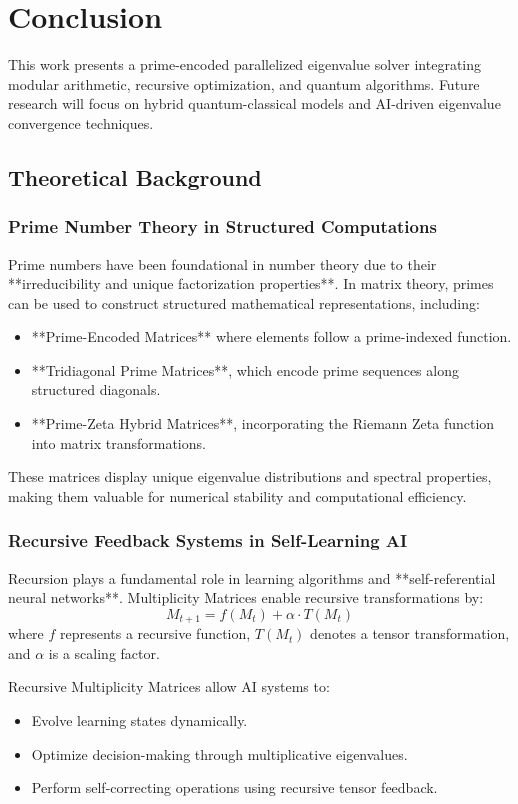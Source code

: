 \documentclass{article}
\theoremstyle{plain}
\begin{document}
\section{Conclusion}
This work presents a prime-encoded parallelized eigenvalue solver integrating modular arithmetic, recursive optimization, and quantum algorithms. Future research will focus on hybrid quantum-classical models and AI-driven eigenvalue convergence techniques.
\subsection{Theoretical Background}

\subsubsection{Prime Number Theory in Structured Computations}
Prime numbers have been foundational in number theory due to their **irreducibility and unique factorization properties**. In matrix theory, primes can be used to construct structured mathematical representations, including:
\begin{itemize}
    \item **Prime-Encoded Matrices** where elements follow a prime-indexed function.
    \item **Tridiagonal Prime Matrices**, which encode prime sequences along structured diagonals.
    \item **Prime-Zeta Hybrid Matrices**, incorporating the Riemann Zeta function into matrix transformations.
\end{itemize}
These matrices display unique eigenvalue distributions and spectral properties, making them valuable for numerical stability and computational efficiency.

\subsubsection{Recursive Feedback Systems in Self-Learning AI}
Recursion plays a fundamental role in learning algorithms and **self-referential neural networks**. Multiplicity Matrices enable recursive transformations by:
\begin{equation}
    M_{t+1} = f(M_t) + \alpha \cdot T(M_t)
\end{equation}
where \( f \) represents a recursive function, \( T(M_t) \) denotes a tensor transformation, and \( \alpha \) is a scaling factor.

Recursive Multiplicity Matrices allow AI systems to:
\begin{itemize}
    \item Evolve learning states dynamically.
    \item Optimize decision-making through multiplicative eigenvalues.
    \item Perform self-correcting operations using recursive tensor feedback.
\end{itemize}
\end{document}
